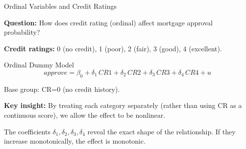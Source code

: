 \documentclass[aspectratio=169, 12pt]{beamer}
\begin{document}
\begin{frame}[shrink=25]{Ordinal Variables and Credit Ratings}

  \textbf{Question:} How does credit rating (ordinal) affect mortgage approval probability?

  \medskip

  \textbf{Credit ratings:} 0 (no credit), 1 (poor), 2 (fair), 3 (good), 4 (excellent).

  \medskip

  \begin{definitionbox}{Ordinal Dummy Model}
    \[
      \textit{approve} = \beta_0 + \delta_1 \, \textit{CR1} + \delta_2 \, \textit{CR2} + \delta_3 \, \textit{CR3} + \delta_4 \, \textit{CR4} + u
    \]

    Base group: CR=0 (no credit history).
  \end{definitionbox}

  \medskip

  \textbf{Key insight:} By treating each category separately (rather than using CR as a continuous score), we allow the effect to be nonlinear.

  \medskip

  \begin{keybox}
    The coefficients $\delta_1, \delta_2, \delta_3, \delta_4$ reveal the exact shape of the relationship.
    If they increase monotonically, the effect is monotonic.
  \end{keybox}

\end{frame}
\end{document}
